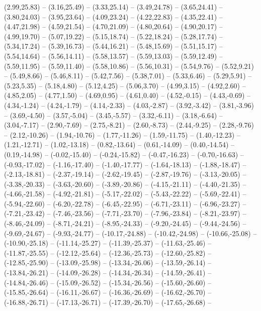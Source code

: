 {  (2.99,25.83) -- (3.16,25.49) -- (3.33,25.14) -- (3.49,24.78) -- (3.65,24.41) -- (3.80,24.03) -- (3.95,23.64) --
  (4.09,23.24) -- (4.22,22.83) -- (4.35,22.41) -- (4.47,21.98) -- (4.59,21.54) -- (4.70,21.09) -- (4.80,20.64) --
  (4.90,20.17) -- (4.99,19.70) -- (5.07,19.22) -- (5.15,18.74) -- (5.22,18.24) -- (5.28,17.74) -- (5.34,17.24) --
  (5.39,16.73) -- (5.44,16.21) -- (5.48,15.69) -- (5.51,15.17) -- (5.54,14.64) -- (5.56,14.11) -- (5.58,13.57) --
  (5.59,13.03) -- (5.59,12.49) -- (5.59,11.95) -- (5.59,11.40) -- (5.58,10.86) -- (5.56,10.31) -- (5.54,9.76) --
  (5.52,9.21) -- (5.49,8.66) -- (5.46,8.11) -- (5.42,7.56) -- (5.38,7.01) -- (5.33,6.46) -- (5.29,5.91) --
  (5.23,5.35) -- (5.18,4.80) -- (5.12,4.25) -- (5.06,3.70) -- (4.99,3.15) -- (4.92,2.60) -- (4.85,2.05) --
  (4.77,1.50) -- (4.69,0.95) -- (4.61,0.40) -- (4.52,-0.15) -- (4.43,-0.69) -- (4.34,-1.24) -- (4.24,-1.79) --
  (4.14,-2.33) -- (4.03,-2.87) -- (3.92,-3.42) -- (3.81,-3.96) -- (3.69,-4.50) -- (3.57,-5.04) -- (3.45,-5.57) --
  (3.32,-6.11) -- (3.18,-6.64) -- (3.04,-7.17) -- (2.90,-7.69) -- (2.75,-8.21) -- (2.60,-8.73) -- (2.44,-9.25) --
  (2.28,-9.76) -- (2.12,-10.26) -- (1.94,-10.76) -- (1.77,-11.26) -- (1.59,-11.75) -- (1.40,-12.23) -- (1.21,-12.71) --
  (1.02,-13.18) -- (0.82,-13.64) -- (0.61,-14.09) -- (0.40,-14.54) -- (0.19,-14.98) -- (-0.02,-15.40) -- (-0.24,-15.82) --
  (-0.47,-16.23) -- (-0.70,-16.63) -- (-0.93,-17.02) -- (-1.16,-17.40) -- (-1.40,-17.77) -- (-1.64,-18.13) -- (-1.88,-18.47) --
  (-2.13,-18.81) -- (-2.37,-19.14) -- (-2.62,-19.45) -- (-2.87,-19.76) -- (-3.13,-20.05) -- (-3.38,-20.33) -- (-3.63,-20.60) --
  (-3.89,-20.86) -- (-4.15,-21.11) -- (-4.40,-21.35) -- (-4.66,-21.58) -- (-4.92,-21.81) -- (-5.17,-22.02) -- (-5.43,-22.22) --
  (-5.69,-22.41) -- (-5.94,-22.60) -- (-6.20,-22.78) -- (-6.45,-22.95) -- (-6.71,-23.11) -- (-6.96,-23.27) -- (-7.21,-23.42) --
  (-7.46,-23.56) -- (-7.71,-23.70) -- (-7.96,-23.84) -- (-8.21,-23.97) -- (-8.46,-24.09) -- (-8.71,-24.21) -- (-8.95,-24.33) --
  (-9.20,-24.45) -- (-9.44,-24.56) -- (-9.69,-24.67) -- (-9.93,-24.77) -- (-10.17,-24.88) -- (-10.42,-24.98) -- (-10.66,-25.08) --
  (-10.90,-25.18) -- (-11.14,-25.27) -- (-11.39,-25.37) -- (-11.63,-25.46) -- (-11.87,-25.55) -- (-12.12,-25.64) -- (-12.36,-25.73) --
  (-12.60,-25.82) -- (-12.85,-25.90) -- (-13.09,-25.98) -- (-13.34,-26.06) -- (-13.59,-26.14) -- (-13.84,-26.21) -- (-14.09,-26.28) --
  (-14.34,-26.34) -- (-14.59,-26.41) -- (-14.84,-26.46) -- (-15.09,-26.52) -- (-15.34,-26.56) -- (-15.60,-26.60) -- (-15.85,-26.64) --
  (-16.11,-26.67) -- (-16.36,-26.69) -- (-16.62,-26.70) -- (-16.88,-26.71) -- (-17.13,-26.71) -- (-17.39,-26.70) -- (-17.65,-26.68) --
}
